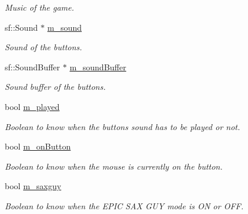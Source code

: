 \begin{DoxyCompactItemize}
\begin{DoxyCompactList}\small\item\em Music of the game. \end{DoxyCompactList}\item 
\hypertarget{class_menu_a515800a21f18924b62fd3463ccf96f1b}{sf\-::\-Sound $\ast$ \hyperlink{class_menu_a515800a21f18924b62fd3463ccf96f1b}{m\-\_\-sound}}\label{class_menu_a515800a21f18924b62fd3463ccf96f1b}

\begin{DoxyCompactList}\small\item\em Sound of the buttons. \end{DoxyCompactList}\item 
\hypertarget{class_menu_a6516df7b5168d23891faf057571d9e1e}{sf\-::\-Sound\-Buffer $\ast$ \hyperlink{class_menu_a6516df7b5168d23891faf057571d9e1e}{m\-\_\-sound\-Buffer}}\label{class_menu_a6516df7b5168d23891faf057571d9e1e}

\begin{DoxyCompactList}\small\item\em Sound buffer of the buttons. \end{DoxyCompactList}\item 
\hypertarget{class_menu_add2ba5dc61b328bdc2c5559b929de940}{bool \hyperlink{class_menu_add2ba5dc61b328bdc2c5559b929de940}{m\-\_\-played}}\label{class_menu_add2ba5dc61b328bdc2c5559b929de940}

\begin{DoxyCompactList}\small\item\em Boolean to know when the buttons sound has to be played or not. \end{DoxyCompactList}\item 
\hypertarget{class_menu_accd3dfcde70f4e248ec11f9d1361003d}{bool \hyperlink{class_menu_accd3dfcde70f4e248ec11f9d1361003d}{m\-\_\-on\-Button}}\label{class_menu_accd3dfcde70f4e248ec11f9d1361003d}

\begin{DoxyCompactList}\small\item\em Boolean to know when the mouse is currently on the button. \end{DoxyCompactList}\item 
\hypertarget{class_menu_a468a4767b5ca00db10b36f4147f74879}{bool \hyperlink{class_menu_a468a4767b5ca00db10b36f4147f74879}{m\-\_\-saxguy}}\label{class_menu_a468a4767b5ca00db10b36f4147f74879}

\begin{DoxyCompactList}\small\item\em Boolean to know when the E\-P\-I\-C S\-A\-X G\-U\-Y mode is O\-N or O\-F\-F. \end{DoxyCompactList}\end{DoxyCompactItemize}

